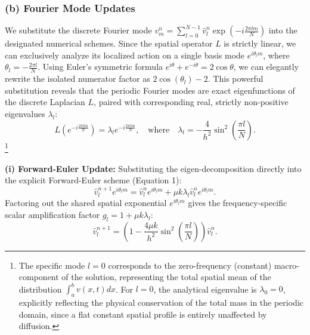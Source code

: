 \begin{solution}
\subsubsection*{(b) Fourier Mode Updates}
We substitute the discrete Fourier mode $v_m^n = \sum_{l=0}^{N-1} \hat{v}_l^n \exp\left(-i \frac{2\pi l m}{N}\right)$ into the designated numerical schemes. Since the spatial operator $L$ is strictly linear, we can exclusively analyze its localized action on a single basis mode $e^{i \theta_l m}$, where $\theta_l = -\frac{2\pi l}{N}$.
Using Euler's symmetric formula $e^{i\theta} + e^{-i\theta} = 2\cos\theta$, we can elegantly rewrite the isolated numerator factor as $2 \cos(\theta_l) - 2$.
This powerful substitution reveals that the periodic Fourier modes are exact eigenfunctions of the discrete Laplacian $L$, paired with corresponding real, strictly non-positive eigenvalues $\lambda_l$:
\[
L \left( e^{-i \frac{2\pi l m}{N}} \right) = \lambda_l e^{-i \frac{2\pi l m}{N}}, \quad \text{where} \quad \lambda_l = -\frac{4}{h^2} \sin^2\left( \frac{\pi l}{N} \right).
\]
\footnote{The specific mode $l=0$ corresponds to the zero-frequency (constant) macro-component of the solution, representing the total spatial mean of the distribution $\int_a^b v(x,t) dx$. For $l=0$, the analytical eigenvalue is $\lambda_0 = 0$, explicitly reflecting the physical conservation of the total mass in the periodic domain, since a flat constant spatial profile is entirely unaffected by diffusion.}

\textbf{(i) Forward-Euler Update:}
Substituting the eigen-decomposition directly into the explicit Forward-Euler scheme (Equation 1):
\[
\hat{v}_l^{n+1} e^{i \theta_l m} = \hat{v}_l^n e^{i \theta_l m} + \mu k \lambda_l \hat{v}_l^n e^{i \theta_l m}.
\]
Factoring out the shared spatial exponential $e^{i \theta_l m}$ gives the frequency-specific scalar amplification factor $g_l = 1 + \mu k \lambda_l$:
\[
\hat{v}_l^{n+1} = \left( 1 - \frac{4 \mu k}{h^2} \sin^2\left(\frac{\pi l}{N}\right) \right) \hat{v}_l^n.
\]


\end{solution}
